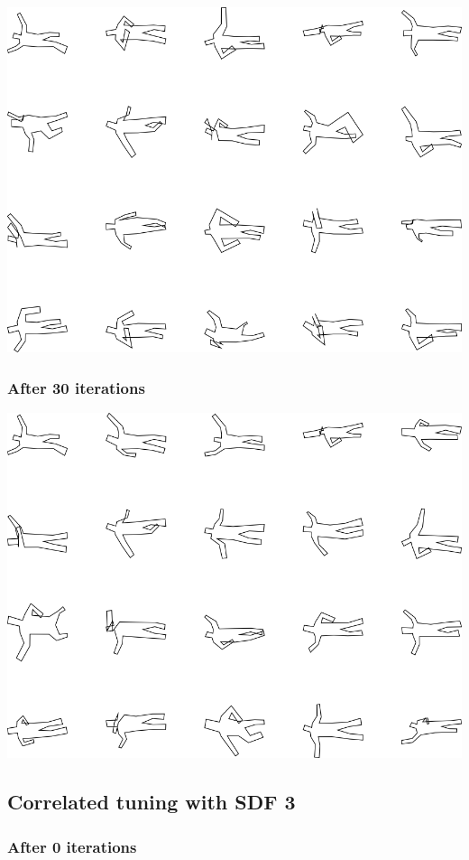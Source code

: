 \includegraphics[width=6in]{output/3.learning/correlated_tuning/correlated_tuning_iter20_.png}
\subsubsection{After 30 iterations}

\includegraphics[width=6in]{output/3.learning/correlated_tuning/correlated_tuning_iter30_.png}
\subsection{Correlated tuning with SDF 3}

\subsubsection{After 0 iterations}


